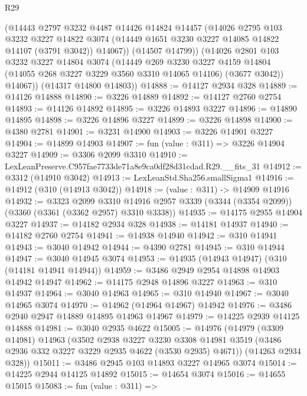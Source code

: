 \begin{lexlean}{R29}
\begin{coremodule}
          (@14443
            @2797
            @3232
            @4487
            @14426
            @14824
            @14457
            (@14026
              @2795
              @103
              @3232
              @3227
              @14822
              @3074
              (@14449 @1651 @3230 @3227 @14085 @14822 @14107 (@3791 @3042))
              @14067))
          (@14507 @14799))
        (@14026
          @2801
          @103
          @3232
          @3227
          @14804
          @3074
          (@14449
            @269
            @3230
            @3227
            @4159
            @14804
            (@14055 @268 @3227 @3229 @3560 @3310 @14065 @14106)
            (@3677 @3042))
          @14067))
      (@14317 @14800 @14803))
@14888 := @14127 @2934 @328
@14889 := @14126 @14888
@14890 := @3226 @14889
@14892 := @14127 @2760 @2754
@14893 := @14126 @14892
@14895 := @3226 @14893 @3227
@14896 := @14890 @14895
@14898 := @3226 @14896 @3227
@14899 := @3226 @14898
@14900 := @4380 @2781
@14901 := @3231 @14900
@14903 := @3226 @14901 @3227
@14904 := @14899 @14903
@14907 := fun (value : @311) => @3226 @14904 @3227
@14909 := @3306 @2099 @3310
@14910 := LexLeanPreserve.C957fae7733de71a8e9ca0df28d31cdad.R29.__fits_31
@14912 := @3312 (@14910 @3042)
@14913 := LexLeanStd.Sha256.smallSigma1
@14916 := @14912 (@310 (@14913 @3042))
@14918 := (value : @311) -> @14909 @14916
@14932 := @3323
    @2099
    @3310
    @14916
    @2957
    @3339
    (@3344 (@3354 @2099))
    (@3360 (@3361 (@3362 @2957) @3310 @3338))
@14935 := @14175 @2955 @14904 @3227
@14937 := @14182 @2934 @328
@14938 := @14181 @14937
@14940 := @14182 @2760 @2754
@14941 := @14938 @14940
@14942 := @310 @14941
@14943 := @3040 @14942
@14944 := @4390 @2781
@14945 := @310 @14944
@14947 := @3040 @14945 @3074
@14953 := @14935 (@14943 @14947) (@310 (@14181 @14941 @14944))
@14959 := @3486 @2949 @2954 @14898 @14903 @14942 @14947
@14962 := @14175 @2948 @14896 @3227
@14963 := @310 @14937
@14964 := @3040 @14963
@14965 := @310 @14940
@14967 := @3040 @14965 @3074
@14970 := @14962 (@14964 @14967) @14942
@14976 := @3486 @2940 @2947 @14889 @14895 @14963 @14967
@14979 := @14225 @2939 @14125 @14888
@14981 := @3040 @2935 @4622
@15005 := @14976
    (@14979
      (@3309 @14981)
      @14963
      (@3502
        @2938
        @3227
        @3230
        @3308
        @14981
        @3519
        (@3486 @2936 @332 @3227 @3229 @2935 @4622 (@3530 @2935) @4671))
      (@14263 @2934 @328))
@15011 := @3486 @2945 @103 @14893 @3227 @14965 @3074
@15014 := @14225 @2944 @14125 @14892
@15015 := @14654 @3074
@15016 := @14655 @15015
@15083 := fun (value : @311) =>

\end{coremodule}
\end{lexlean}

